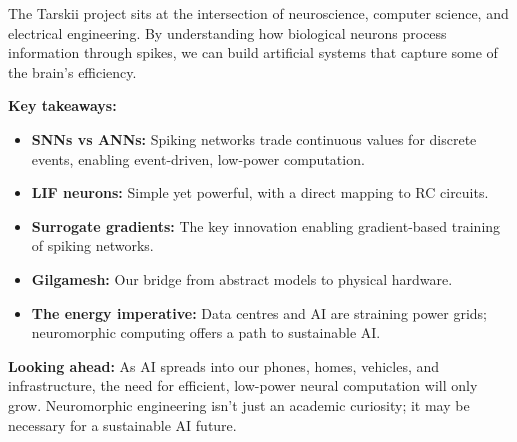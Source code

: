 \documentclass[11pt,a4paper]{article}
\begin{document}
The Tarskii project sits at the intersection of neuroscience, computer science, and electrical engineering. By understanding how biological neurons process information through spikes, we can build artificial systems that capture some of the brain's efficiency.

\textbf{Key takeaways:}

\begin{itemize}
    \item \textbf{SNNs vs ANNs:} Spiking networks trade continuous values for discrete events, enabling event-driven, low-power computation.

    \item \textbf{LIF neurons:} Simple yet powerful, with a direct mapping to RC circuits.

    \item \textbf{Surrogate gradients:} The key innovation enabling gradient-based training of spiking networks.

    \item \textbf{Gilgamesh:} Our bridge from abstract models to physical hardware.

    \item \textbf{The energy imperative:} Data centres and AI are straining power grids; neuromorphic computing offers a path to sustainable AI.
\end{itemize}

\begin{tcolorbox}[infobox]
\textbf{Looking ahead:} As AI spreads into our phones, homes, vehicles, and infrastructure, the need for efficient, low-power neural computation will only grow. Neuromorphic engineering isn't just an academic curiosity; it may be necessary for a sustainable AI future.
\end{tcolorbox}
\end{document}
